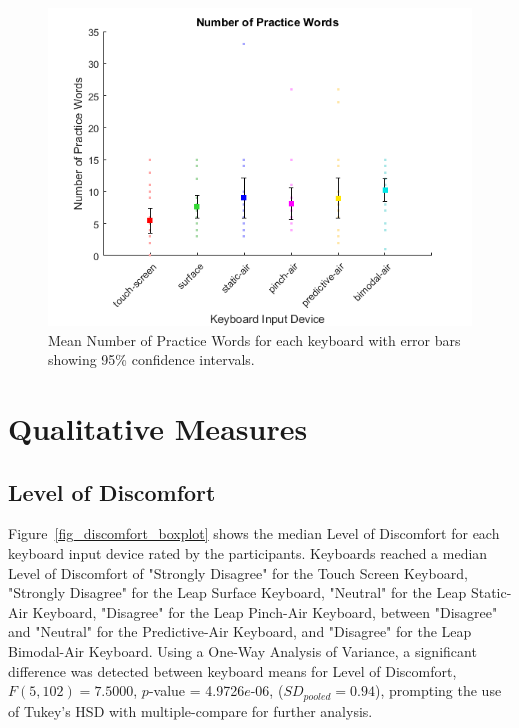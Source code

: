 \begin{figure}[h]
	\centering
	\includegraphics{fig_num_practice_mean}
	\caption[Mean Number of Practice Words]{Mean Number of Practice Words for each keyboard with error bars showing 95\% confidence intervals.}
	\label{fig_num_practice_mean}
\end{figure}

\section{Qualitative Measures}

\subsection{Level of Discomfort}
Figure~\ref{fig_discomfort_boxplot} shows the median Level of Discomfort for each keyboard input device rated by the participants. Keyboards reached a median Level of Discomfort of "Strongly Disagree" for the Touch Screen Keyboard, "Strongly Disagree" for the Leap Surface Keyboard, "Neutral" for the Leap Static-Air Keyboard, "Disagree" for the Leap Pinch-Air Keyboard, between "Disagree" and "Neutral" for the Predictive-Air Keyboard, and "Disagree" for the Leap Bimodal-Air Keyboard. Using a One-Way Analysis of Variance, a significant difference was detected between keyboard means for Level of Discomfort, $F(5, 102) = 7.5000$, $p$-value = 4.9726$e$-06, ($SD_{pooled} = 0.94$), prompting the use of Tukey's HSD with multiple-compare for further analysis.

